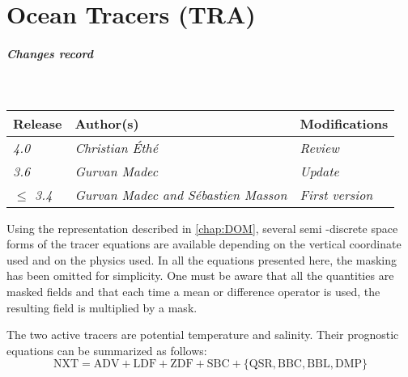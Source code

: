 \documentclass[../main/NEMO_manual]{subfiles}
\begin{document}
\chapter{Ocean Tracers (TRA)}
\label{chap:TRA}

\chaptertoc

\paragraph{Changes record} ~\\

{\footnotesize
  \begin{tabularx}{\textwidth}{l||X|X}
    Release          & Author(s)                                   & Modifications       \\
    \hline
    {\em        4.0} & {\em Christian \'{E}th\'{e}               } & {\em Review       } \\
    {\em        3.6} & {\em Gurvan Madec                         } & {\em Update       } \\
    {\em $\leq$ 3.4} & {\em Gurvan Madec and S\'{e}bastien Masson} & {\em First version} \\
  \end{tabularx}
}

\clearpage



Using the representation described in \autoref{chap:DOM}, several semi -discrete space forms of
the tracer equations are available depending on the vertical coordinate used and on the physics used.
In all the equations presented here, the masking has been omitted for simplicity.
One must be aware that all the quantities are masked fields and that
each time a mean or difference operator is used, the resulting field is multiplied by a mask.

The two active tracers are potential temperature and salinity.
Their prognostic equations can be summarized as follows:
\[
  \text{NXT} =     \text{ADV} + \text{LDF} + \text{ZDF} + \text{SBC}
               + \{\text{QSR},  \text{BBC},  \text{BBL},  \text{DMP}\}
\]
\end{document}

